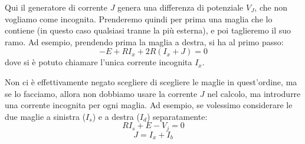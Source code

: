 \documentclass[a4paper,11pt]{article}
\begin{document}
Qui il generatore di corrente $J$ genera una differenza di potenziale $V_J$, che non vogliamo come incognita.
Prenderemo quindi per prima una maglia che lo contiene (in questo caso qualsiasi tranne la più esterna), e poi taglieremo il suo ramo.
Ad esempio, prendendo prima la maglia a destra, si ha al primo passo:
$$
-E + R I_x + 2R(I_x + J) = 0
$$
dove si è potuto chiamare l'unica corrente incognita $I_x$.

Non ci è effettivamente negato scegliere di scegliere le maglie in quest'ordine, ma se lo facciamo, allora non dobbiamo usare la corrente $J$ nel calcolo, ma introdurre una corrente incognita per ogni maglia.
Ad esempio, se volessimo considerare le due maglie a sinistra ($I_s$) e a destra ($I_d$) separatamente:
$$ 
R I_s + E - V_j = 0 
$$
$$
J = I_x + I_b
$$
\end{document}
